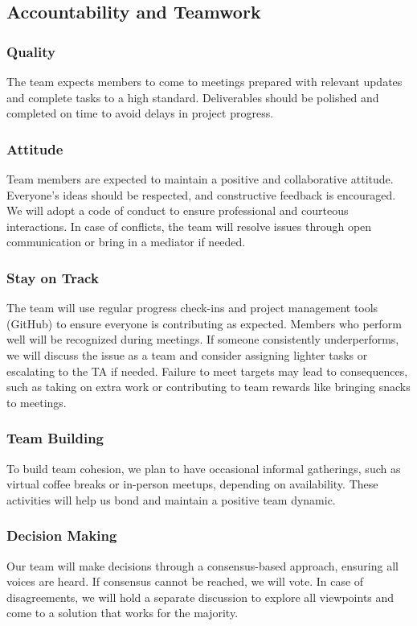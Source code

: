 \documentclass{article}
\begin{document}
\subsection*{Accountability and Teamwork}

\subsubsection*{Quality} 

The team expects members to come to meetings prepared with relevant updates and complete tasks
to a high standard. Deliverables should be polished and completed on time to avoid delays in
project progress.

\subsubsection*{Attitude}

Team members are expected to maintain a positive and collaborative attitude. Everyone’s ideas
should be respected, and constructive feedback is encouraged. We will adopt a code of conduct
to ensure professional and courteous interactions. In case of conflicts, the team will resolve
issues through open communication or bring in a mediator if needed.

\subsubsection*{Stay on Track}

The team will use regular progress check-ins and project management tools (GitHub)
to ensure everyone is contributing as expected. Members who perform well will be recognized during
meetings. If someone consistently underperforms, we will discuss the issue as a team and consider
assigning lighter tasks or escalating to the TA if needed. Failure to meet targets may lead to
consequences, such as taking on extra work or contributing to team rewards like bringing snacks to meetings.

\subsubsection*{Team Building}

To build team cohesion, we plan to have occasional informal gatherings, such as virtual coffee breaks
or in-person meetups, depending on availability. These activities will help us bond and maintain a 
positive team dynamic.

\subsubsection*{Decision Making} 

Our team will make decisions through a consensus-based approach, ensuring all voices are heard. If
consensus cannot be reached, we will vote. In case of disagreements, we will hold a separate discussion
to explore all viewpoints and come to a solution that works for the majority.
\end{document}
